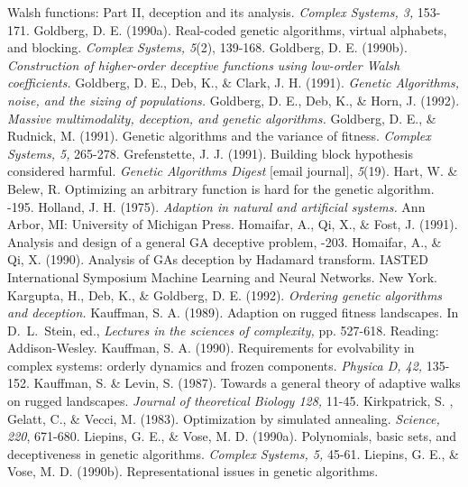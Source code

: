 \begin{thereferences}
	Walsh functions: Part II, deception and its analysis. {\em Complex
	Systems, 3,} 153-171.
 Goldberg, D. E. (1990a). Real-coded genetic algorithms,
	virtual alphabets, and blocking.
	{\em Complex Systems, 5}(2), 139-168.
 Goldberg, D. E. (1990b).  {\em Construction of
	higher-order deceptive functions using low-order Walsh coefficients.}
 Goldberg, D. E., Deb, K., \& Clark, J. H. (1991).
	{\em Genetic Algorithms, noise, and the sizing of populations.}
 Goldberg, D. E., Deb, K., \& Horn, J. (1992). {\em Massive
	multimodality, deception, and genetic algorithms.}
 Goldberg, D. E., \& Rudnick, M. (1991). Genetic algorithms
	and the variance of fitness. {\em Complex Systems, 5,} 265-278.
 Grefenstette, J. J. (1991). Building block hypothesis
	considered harmful. {\em Genetic Algorithms Digest} [email
	journal], {\em 5}(19).
 Hart, W. \& Belew, R.
	Optimizing an arbitrary function is hard for the genetic
	algorithm.
	-195.
 Holland, J. H. (1975).  {\em Adaption in natural and
	artificial systems.}  Ann Arbor, MI: University of Michigan Press.
 Homaifar, A., Qi, X., \& Fost, J. (1991). Analysis and
	design of a general GA deceptive problem,
	-203.
 Homaifar, A., \& Qi, X. (1990).
	Analysis of GAs deception by Hadamard transform.
	IASTED International Symposium Machine Learning and Neural
	Networks.  New York.
 Kargupta, H., Deb, K., \& Goldberg, D. E. (1992).
	{\em Ordering genetic algorithms and deception.}
 Kauffman, S. A. (1989).
	Adaption on rugged fitness landscapes.
	In D.~L.~Stein, ed., {\em Lectures in the sciences of
	complexity,} pp. 527-618.  Reading: Addison-Wesley.
 Kauffman, S. A. (1990).
	Requirements for evolvability in complex systems:
	orderly dynamics and frozen components. {\em Physica D, 42,}
	135-152.
 Kauffman, S. \& Levin, S. (1987).
	Towards a general theory of adaptive walks on rugged landscapes.
	{\em Journal of theoretical Biology 128,} 11-45.
 Kirkpatrick, S. , Gelatt, C., \& Vecci, M.  (1983).  
	Optimization by simulated annealing. {\em Science, 220}, 671-680.
 Liepins, G. E., \& Vose, M. D. (1990a).
	Polynomials, basic sets, and deceptiveness in genetic algorithms.
	{\em Complex Systems, 5,} 45-61.
 Liepins, G. E., \& Vose, M. D. (1990b).
	Representational issues in genetic algorithms.

\end{thereferences}
